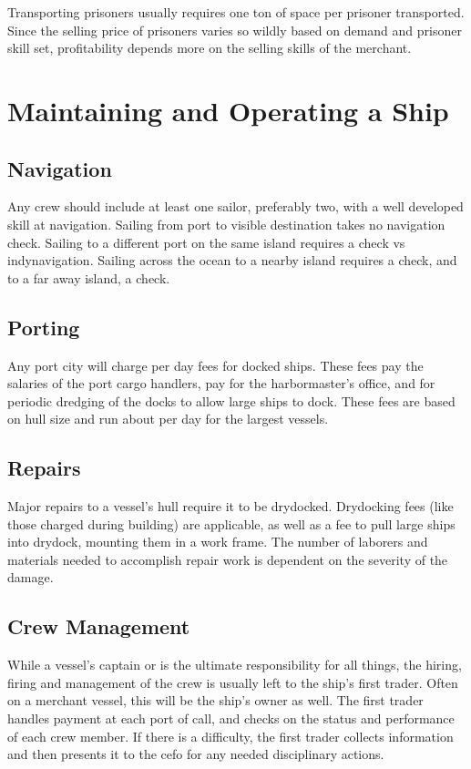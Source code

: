 \begin{multicols*}{2}
Transporting prisoners usually requires one ton of space per prisoner transported. Since the selling price of prisoners varies so wildly based on demand and prisoner skill set, profitability depends more on the selling skills of the merchant.
\section{Maintaining and Operating a Ship}
\subsection{Navigation}
Any crew should include at least one sailor, preferably two, with a well developed skill at navigation. Sailing from port to visible destination takes no navigation check. Sailing to a different port on the same island requires a  check vs indy{navigation}. Sailing across the ocean to a nearby island requires a  check, and to a far away island, a  check.
\subsection{Porting}
Any port city will charge per day fees for docked ships. These fees pay the salaries of the port cargo handlers, pay for the harbormaster's office, and for periodic dredging of the docks to allow large ships to dock. These fees are based on hull size and run about \tcdefine{100 sp} per day for the largest vessels.
\subsection{Repairs}
Major repairs to a vessel's hull require it to be drydocked. Drydocking fees (like those charged during building) are applicable, as well as a  fee to pull large ships into drydock, mounting them in a work frame. The number of laborers and materials needed to accomplish repair work is dependent on the severity of the damage.
\subsection{Crew Management}
While a vessel's captain or  is the ultimate responsibility for all things, the hiring, firing and management of the crew is usually left to the ship's first trader. Often on a merchant vessel, this will be the ship's owner as well. The first trader handles payment at each port of call, and checks on the status and performance of each crew member. If there is a difficulty, the first trader collects information and then presents it to the cefo for any needed disciplinary actions.

\end{multicols*}
